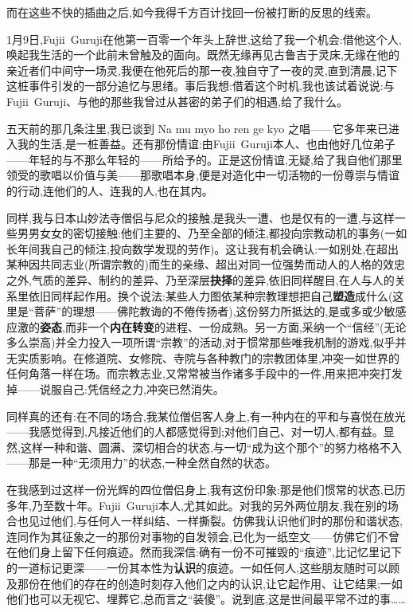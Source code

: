 而在这些不快的插曲之后,如今我得千方百计找回一份被打断的反思的线索。

1月9日,Fujii~Guruji在他第一百零一个年头上辞世,这给了我一个机会:借他这个人,唤起我生活的一个此前未曾触及的面向。既然无缘再见古鲁吉于灵床,无缘在他的亲近者们中间守一场灵,我便在他死后的那一夜,独自守了一夜的灵,直到清晨,记下这桩事件引发的一部分追忆与思绪。事后我想:借着这个时机,我也该试着说说:与Fujii~Guruji、与他的那些我曾过从甚密的弟子们的相遇,给了我什么。

五天前的那几条注里,我已谈到 Na mu myo ho ren ge kyo 之唱——它多年来已进入我的生活,是一桩善益。还有那份情谊:由Fujii~Guruji本人、也由他好几位弟子——年轻的与不那么年轻的——所给予的。正是这份情谊,无疑,给了我自他们那里领受的歌唱以价值与美——那歌唱本身,便是对造化中一切活物的一份尊崇与情谊的行动,连他们的人、连我的人,也在其内。

同样,我与日本山妙法寺僧侣与尼众的接触,是我头一遭、也是仅有的一遭,与这样一些男男女女的密切接触:他们主要的、乃至全部的倾注,都投向宗教动机的事务(一如长年间我自己的倾注,投向数学发现的劳作)。这让我有机会确认:一如别处,在超出某种因共同志业(所谓宗教的)而生的亲缘、超出对同一位强势而动人的人格的效忠之外,气质的差异、制约的差异、乃至深层\textbf{抉择}的差异,依旧同样醒目,在人与人的关系里依旧同样起作用。换个说法:某些人力图依某种宗教理想把自己\textbf{塑造}成什么(这里是“菩萨”的理想——佛陀教诲的不倦传扬者),这份努力所抵达的\dmark{},是或多或少敏感应激的\textbf{姿态},而非一个\textbf{内在转变}的进程、一份成熟。另一方面,采纳一个“信经”(无论多么崇高)并全力投入一项所谓“宗教”的活动,对于惯常那些唯我机制的游戏,似乎并无实质影响。在修道院、女修院、寺院与各种教门的宗教团体里,冲突一如世界的任何角落一样在场。而宗教志业,又常常被当作诸多手段中的一件,用来把冲突打发掉——说服自己:凭信经之力,冲突已然消失。

同样真的还有:在不同的场合,我某位僧侣客人身上,有一种内在的平和与喜悦在放光——我感觉得到,凡接近他们的人都感觉得到;对他们自己、对一切人,都有益。显然,这样一种和谐、圆满、深切相合的状态,与一切“成为这个那个”的努力格格不入——那是一种“无须用力”的状态,一种全然自然的状态。

在我感到过这样一份光辉的四位僧侣身上,我有这份印象:那是他们惯常的状态,已历多年,乃至数十年。Fujii~Guruji本人,尤其如此。对我的另外两位朋友,我在别的场合也见过他们,与任何人一样纠结、一样撕裂。仿佛我认识他们时的那份和谐状态,连同作为其征象之一的那份对事物的自发领会,已化为一纸空文——仿佛它们不曾在他们身上留下任何痕迹。然而我深信:确有一份不可摧毁的“痕迹”,比记忆里记下的一道标记更深——一份其本性为\textbf{认识}的痕迹。一如任何人,这些朋友随时可以顾及那份在他们的存在的创造时刻存入他们之内的认识,让它起作用、让它结果;一如他们也可以无视它、埋葬它,总而言之“装傻”。说到底,这是世间最平常不过的事……

